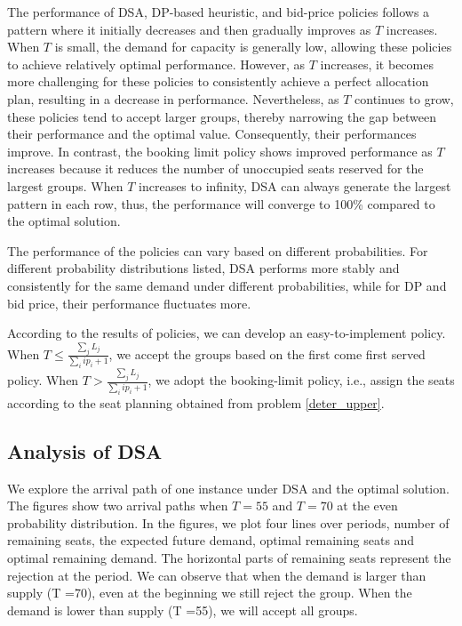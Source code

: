 The performance of DSA, DP-based heuristic, and bid-price policies follows a pattern where it initially decreases and then gradually improves as $T$ increases. When $T$ is small, the demand for capacity is generally low, allowing these policies to achieve relatively optimal performance. However, as $T$ increases, it becomes more challenging for these policies to consistently achieve a perfect allocation plan, resulting in a decrease in performance. Nevertheless, as $T$ continues to grow, these policies tend to accept larger groups, thereby narrowing the gap between their performance and the optimal value. Consequently, their performances improve. In contrast, the booking limit policy shows improved performance as $T$ increases because it reduces the number of unoccupied seats reserved for the largest groups. When $T$ increases to infinity, DSA can always generate the largest pattern in each row, thus, the performance will converge to 100\% compared to the optimal solution.

The performance of the policies can vary based on different probabilities. For different probability distributions listed, DSA performs more stably and consistently for the same demand under different probabilities, while for DP and bid price, their performance fluctuates more.

According to the results of policies, we can develop an easy-to-implement policy. When $T \leq \frac{\sum_{j}{L_j}}{\sum_{i} i p_i + 1}$, we accept the groups based on the first come first served policy.
When $T > \frac{\sum_{j}{L_j}}{\sum_{i} i p_i + 1}$, we adopt the booking-limit policy, i.e., assign the seats according to the seat planning obtained from problem \eqref{deter_upper}.

\subsection*{Analysis of DSA}
We explore the arrival path of one instance under DSA and the optimal solution. The figures show two arrival paths when $T= 55$ and $T= 70$ at the even probability distribution. In the figures, we plot four lines over periods, number of remaining seats, the expected future demand, optimal remaining seats and optimal remaining demand. The horizontal parts of remaining seats represent the rejection at the period. We can observe that when the demand is larger than supply (T =70), even at the beginning we still reject the group. When the demand is lower than supply (T =55), we will accept all groups.

